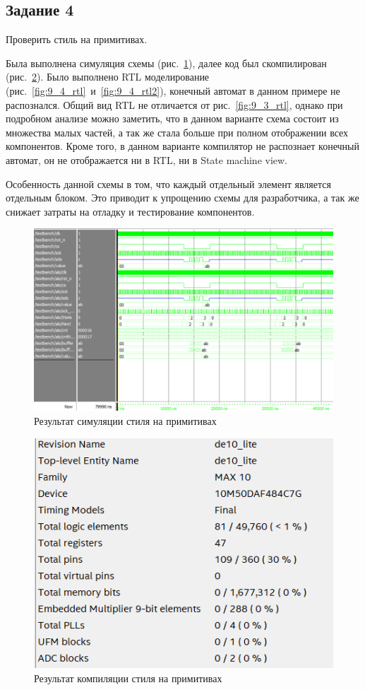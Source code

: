 \documentclass[a4paper,14pt]{article}
\begin{document}
	\subsection{Задание 4}

	Проверить стиль на примитивах.
	
	Была выполнена симуляция схемы (рис.~\ref{fig:9_4_wave}), далее код был скомпилирован (рис.~\ref{fig:9_4_compilation}).
	Было выполнено RTL моделирование (рис.~\ref{fig:9_4_rtl}~и~\ref{fig:9_4_rtl2}), конечный автомат в данном примере не распознался.
	Общий вид RTL не отличается от рис.~\ref{fig:9_3_rtl}, однако при подробном анализе можно заметить, что в данном варианте схема состоит из множества малых частей, а так же стала больше при полном отображении всех компонентов.
	Кроме того, в данном варианте компилятор не распознает конечный автомат, он не отображается ни в RTL, ни в State machine view.
	
	Особенность данной схемы в том, что каждый отдельный элемент является отдельным блоком.
	Это приводит к упрощению схемы для разработчика, а так же снижает затраты на отладку и тестирование компонентов. 
	
	\begin{figure}[H]
		\centering
		\includegraphics[width=0.9\linewidth]{images/9_4_wave}
		\caption{Результат симуляции стиля на примитивах}
		\label{fig:9_4_wave}
	\end{figure}
	
	\begin{figure}[H]
		\centering
		\includegraphics[width=0.5\linewidth]{images/9_4_compilation}
		\caption{Результат компиляции стиля на примитивах}
		\label{fig:9_4_compilation}
	\end{figure}
	
\end{document}
